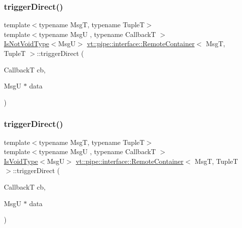 \subsubsection{\texorpdfstring{trigger\+Direct()}{triggerDirect()}\hspace{0.1cm}{\footnotesize\ttfamily [1/5]}}
{\footnotesize\ttfamily template$<$typename MsgT, typename TupleT$>$ \\
template$<$typename MsgU , typename CallbackT $>$ \\
\hyperlink{structvt_1_1pipe_1_1interface_1_1_remote_container_a1dc69f6cfa1318c856a412940e3dbb50}{Is\+Not\+Void\+Type}$<$MsgU$>$ \hyperlink{structvt_1_1pipe_1_1interface_1_1_remote_container}{vt\+::pipe\+::interface\+::\+Remote\+Container}$<$ MsgT, TupleT $>$\+::trigger\+Direct (\begin{DoxyParamCaption}\item[{CallbackT}]{cb,  }\item[{MsgU $\ast$}]{data }\end{DoxyParamCaption})\hspace{0.3cm}{\ttfamily [private]}}

\mbox{\label{structvt_1_1pipe_1_1interface_1_1_remote_container_ade1e4348b3f29b9fdb2fec5966b673f1}} 
\subsubsection{\texorpdfstring{trigger\+Direct()}{triggerDirect()}\hspace{0.1cm}{\footnotesize\ttfamily [2/5]}}
{\footnotesize\ttfamily template$<$typename MsgT, typename TupleT$>$ \\
template$<$typename MsgU , typename CallbackT $>$ \\
\hyperlink{structvt_1_1pipe_1_1interface_1_1_remote_container_a0cf5387a6b1db885a7a224bab60ce16d}{Is\+Void\+Type}$<$MsgU$>$ \hyperlink{structvt_1_1pipe_1_1interface_1_1_remote_container}{vt\+::pipe\+::interface\+::\+Remote\+Container}$<$ MsgT, TupleT $>$\+::trigger\+Direct (\begin{DoxyParamCaption}\item[{CallbackT}]{cb,  }\item[{MsgU $\ast$}]{data }\end{DoxyParamCaption})\hspace{0.3cm}{\ttfamily [private]}}

